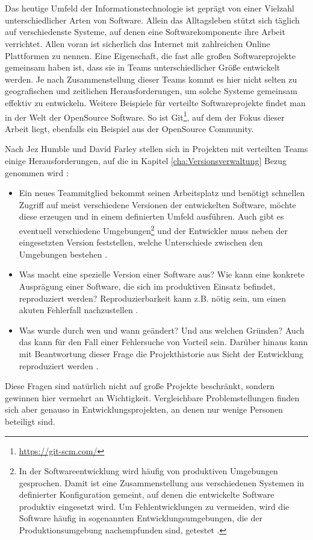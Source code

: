 \chapter{\preamble}
\label{cha:preamble}
Das heutige Umfeld der Informationstechnologie ist gepr\"agt von einer Vielzahl
unterschiedlicher Arten von Software. Allein das Alltagsleben stützt sich
täglich auf verschiedenste Systeme, auf denen eine Softwarekomponente ihre
Arbeit verrichtet.  Allen voran ist sicherlich das Internet mit zahlreichen
Online Plattformen zu nennen.  Eine Eigenschaft, die fast alle gro\ss{}en
Softwareprojekte gemeinsam haben ist, dass sie in Teams unterschiedlicher
Gr\"o\ss{}e entwickelt werden. Je nach Zusammenstellung dieser Teams kommt es
hier nicht selten zu geografischen und zeitlichen Herausforderungen, um solche
Systeme gemeinsam effektiv zu entwickeln.  Weitere Beispiele f\"ur verteilte
Softwareprojekte findet man in der Welt der \gls{OpenSource} Software.  So ist
Git\footnote{\label{git:1}\url{https://git-scm.com/}}, auf dem der Fokus dieser
Arbeit liegt, ebenfalls ein Beispiel aus der \gls{OpenSource} Community. 

Nach Jez Humble und David Farley stellen sich in Projekten mit verteilten
Teams einige Herausforderungen, auf die in Kapitel
\ref{cha:Versionsverwaltung} Bezug genommen wird \cite[S.~26, 33]{cd}:
\begin{itemize}
	\item Ein neues Teammitglied bekommt seinen Arbeitsplatz und ben\"otigt
	schnellen Zugriff auf meist verschiedene Versionen der entwickelten Software,
	m\"ochte diese erzeugen und in einem definierten Umfeld ausf\"uhren. Auch gibt
	es eventuell verschiedene Umgebungen\footnote{\label{umgebung:1}In der
	Softwareentwicklung wird häufig von produktiven Umgebungen gesprochen. Damit
	ist eine Zusammenstellung aus verschiedenen Systemen in definierter
	Konfiguration gemeint, auf denen die entwickelte Software produktiv eingesetzt
	wird. Um Fehlentwicklungen zu vermeiden, wird die Software häufig in
	sogenannten Entwicklungsumgebungen, die der Produktionsumgebung nachempfunden
	sind, getestet \cite[S.~49, 250]{cd}.} und der Entwickler muss neben der
	eingesetzten Version feststellen, welche Unterschiede zwischen den Umgebungen
	bestehen \citep[S.~26]{cd}.
  \item Was macht eine spezielle Version einer Software aus? Wie kann eine
  konkrete Auspr\"agung einer Software, die sich im produktiven Einsatz
  befindet, reproduziert werden? Reproduzierbarkeit kann z.B. n\"otig sein, um
  einen akuten Fehlerfall nachzustellen \cite[s.~33]{cd}.
  \item Was wurde durch wen und wann ge\"andert? Und aus welchen Gr\"unden?
  Auch das kann f\"ur den Fall einer Fehlersuche von Vorteil sein. Darüber
  hinaus kann mit Beantwortung dieser Frage die Projekthistorie aus Sicht der
  Entwicklung reproduziert werden \cite[S.~33]{cd}.
\end{itemize}
Diese Fragen sind natürlich nicht auf große Projekte beschränkt, sondern
gewinnen hier vermehrt an Wichtigkeit. Vergleichbare Problemstellungen finden
sich aber genauso in Entwicklungsprojekten, an denen nur wenige Personen
beteiligt sind. 

